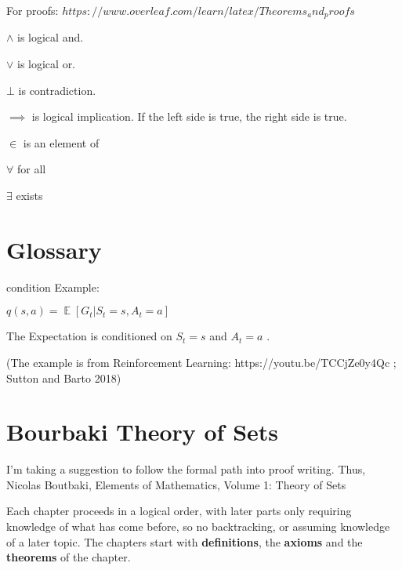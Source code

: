 \documentclass[]{scrartcl}
\DeclareMathOperator{\EX}{\mathbb{E}}%
\begin{document}
For proofs: $https://www.overleaf.com/learn/latex/Theorems_and_proofs$

$\land$ is logical and.

$\lor$ is logical or.

$\bot$ is contradiction.

$\implies$ is logical implication. If the left side is true, the right side is true.

$\in$ is an element of 

$\forall$ for all 

$\exists$ exists 


\section{Glossary}


\gls{condition} Example: 

$q(s,a) = \EX[G_t |S_t=s, A_t=a]$

The Expectation is conditioned on $S_t=s$ and $A_t=a$ .

(The example is from Reinforcement Learning: https://youtu.be/TCCjZe0y4Qc ; Sutton and Barto 2018)
 

\printglossaries

\section{Bourbaki Theory of Sets}

I'm taking a suggestion to follow the formal path into proof writing. Thus, Nicolas Boutbaki, Elements of Mathematics, Volume 1: Theory of Sets

Each chapter proceeds in a logical order, with later parts only requiring knowledge of what has come before, so no backtracking, or assuming knowledge of a later topic.
The chapters start with \textbf{definitions}, the \textbf{axioms} and the \textbf{theorems} of the chapter.
\end{document}
